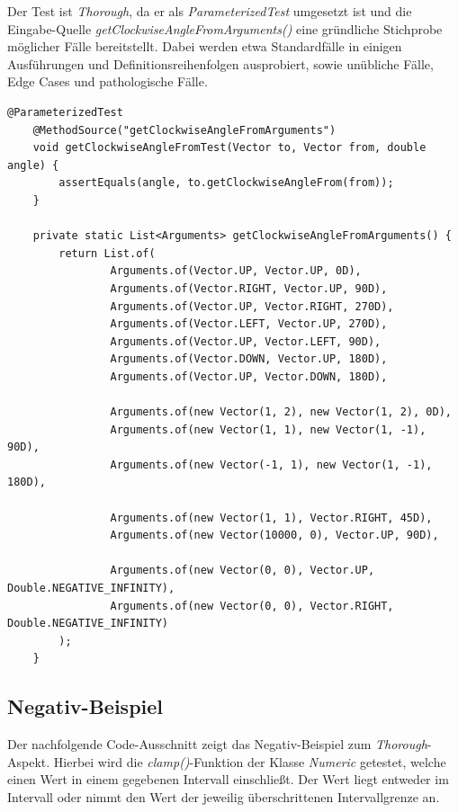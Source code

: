 Der Test ist \textit{Thorough}, da er als \textit{ParameterizedTest}
umgesetzt ist und die Eingabe-Quelle \textit{getClockwiseAngleFromArguments()}
eine gründliche Stichprobe möglicher Fälle bereitstellt. Dabei werden
etwa Standardfälle in einigen Ausführungen und Definitionsreihenfolgen
ausprobiert, sowie unübliche Fälle, Edge Cases und pathologische Fälle.


\vspace{0.5cm}
\begin{lstlisting}[caption={ATRIP: Thorough / Positiv}]
    @ParameterizedTest
    @MethodSource("getClockwiseAngleFromArguments")
    void getClockwiseAngleFromTest(Vector to, Vector from, double angle) {
        assertEquals(angle, to.getClockwiseAngleFrom(from));
    }
    
    private static List<Arguments> getClockwiseAngleFromArguments() {
        return List.of(
                Arguments.of(Vector.UP, Vector.UP, 0D),
                Arguments.of(Vector.RIGHT, Vector.UP, 90D),
                Arguments.of(Vector.UP, Vector.RIGHT, 270D),
                Arguments.of(Vector.LEFT, Vector.UP, 270D),
                Arguments.of(Vector.UP, Vector.LEFT, 90D),
                Arguments.of(Vector.DOWN, Vector.UP, 180D),
                Arguments.of(Vector.UP, Vector.DOWN, 180D),
                
                Arguments.of(new Vector(1, 2), new Vector(1, 2), 0D),
                Arguments.of(new Vector(1, 1), new Vector(1, -1), 90D),
                Arguments.of(new Vector(-1, 1), new Vector(1, -1), 180D),
                
                Arguments.of(new Vector(1, 1), Vector.RIGHT, 45D),
                Arguments.of(new Vector(10000, 0), Vector.UP, 90D),
                
                Arguments.of(new Vector(0, 0), Vector.UP, Double.NEGATIVE_INFINITY),
                Arguments.of(new Vector(0, 0), Vector.RIGHT, Double.NEGATIVE_INFINITY)
        );
    }
\end{lstlisting}

\subsection*{Negativ-Beispiel}
Der nachfolgende Code-Ausschnitt zeigt das Negativ-Beispiel zum
\textit{Thorough}-Aspekt. Hierbei wird die
\textit{clamp()}-Funktion der Klasse
\textit{Numeric} getestet, welche einen Wert in einem gegebenen
Intervall einschließt. Der Wert liegt entweder im Intervall oder
nimmt den Wert der jeweilig überschrittenen Intervallgrenze an.

